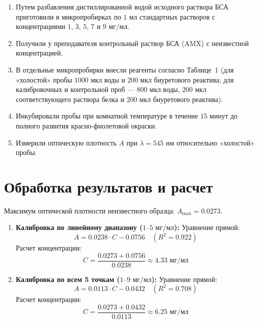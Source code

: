 \documentclass[a4paper,12pt]{article}
\begin{document}
\begin{enumerate}
    \item Путем разбавления дистиллированной водой исходного раствора БСА приготовили в микропробирках по $1\text{~мл}$ стандартных растворов с концентрациями $1$, $3$, $5$, $7$ и $9\text{~мг/мл}$.
    \item Получили у преподавателя контрольный раствор БСА (AMX) с неизвестной концентрацией.
    \item В отдельные микропробирки внесли реагенты согласно Таблице~1 (для «холостой» пробы $1000\text{ мкл}$ воды и $200\text{ мкл}$ биуретового реактива; для калибровочных и контрольной проб — $800\text{ мкл}$ воды, $200\text{ мкл}$ соответствующего раствора белка и $200\text{ мкл}$ биуретового реактива).
    \item Инкубировали пробы при комнатной температуре в течение $15\text{ минут}$ до полного развития красно-фиолетовой окраски.
    \item Измерили оптическую плотность $A$ при $\lambda = 545\text{ нм}$ относительно «холостой» пробы.
\end{enumerate}

\section*{Обработка результатов и расчет}

Максимум оптической плотности неизвестного образца: $A_{\max} = 0.0273$.

\begin{enumerate}
    \item \textbf{Калибровка по линейному диапазону ($1\text{--}5\text{ мг/мл}$):}
    Уравнение прямой:
    \begin{equation*}
        A = 0.0238 \cdot C - 0.0756 \quad (R^2 = 0.922)
    \end{equation*}
    Расчет концентрации:
    \begin{equation*}
        C = \frac{0.0273 + 0.0756}{0.0238} \approx \mathbf{4.33\text{ мг/мл}}
    \end{equation*}

    \item \textbf{Калибровка по всем 5 точкам ($1\text{--}9\text{ мг/мл}$):}
    Уравнение прямой:
    \begin{equation*}
        A = 0.0113 \cdot C - 0.0432 \quad (R^2 = 0.708)
    \end{equation*}
    Расчет концентрации:
    \begin{equation*}
        C = \frac{0.0273 + 0.0432}{0.0113} \approx \mathbf{6.25\text{ мг/мл}}
    \end{equation*}
\end{enumerate}
\end{document}

